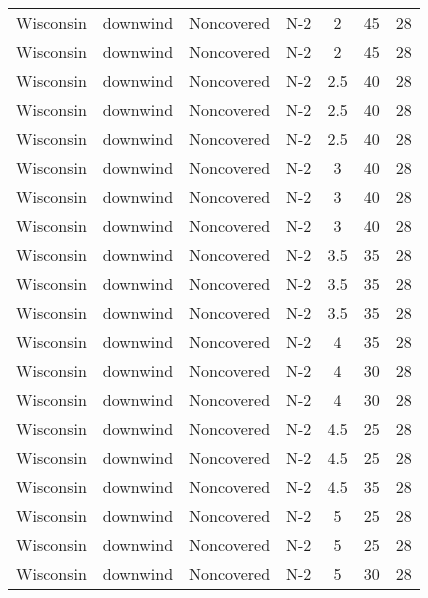 \documentclass{article}
\begin{document}
\begin{longtable}[c]{ccccccc}
Wisconsin & downwind  & Noncovered & N-2             & 2            & 45          & 28  \\
Wisconsin & downwind  & Noncovered & N-2             & 2            & 45          & 28  \\
Wisconsin & downwind  & Noncovered & N-2             & 2.5          & 40          & 28  \\
Wisconsin & downwind  & Noncovered & N-2             & 2.5          & 40          & 28  \\
Wisconsin & downwind  & Noncovered & N-2             & 2.5          & 40          & 28  \\
Wisconsin & downwind  & Noncovered & N-2             & 3            & 40          & 28  \\
Wisconsin & downwind  & Noncovered & N-2             & 3            & 40          & 28  \\
Wisconsin & downwind  & Noncovered & N-2             & 3            & 40          & 28  \\
Wisconsin & downwind  & Noncovered & N-2             & 3.5          & 35          & 28  \\
Wisconsin & downwind  & Noncovered & N-2             & 3.5          & 35          & 28  \\
Wisconsin & downwind  & Noncovered & N-2             & 3.5          & 35          & 28  \\
Wisconsin & downwind  & Noncovered & N-2             & 4            & 35          & 28  \\
Wisconsin & downwind  & Noncovered & N-2             & 4            & 30          & 28  \\
Wisconsin & downwind  & Noncovered & N-2             & 4            & 30          & 28  \\
Wisconsin & downwind  & Noncovered & N-2             & 4.5          & 25          & 28  \\
Wisconsin & downwind  & Noncovered & N-2             & 4.5          & 25          & 28  \\
Wisconsin & downwind  & Noncovered & N-2             & 4.5          & 35          & 28  \\
Wisconsin & downwind  & Noncovered & N-2             & 5            & 25          & 28  \\
Wisconsin & downwind  & Noncovered & N-2             & 5            & 25          & 28  \\
Wisconsin & downwind  & Noncovered & N-2             & 5            & 30          & 28  \\

\end{longtable}
\end{document}
